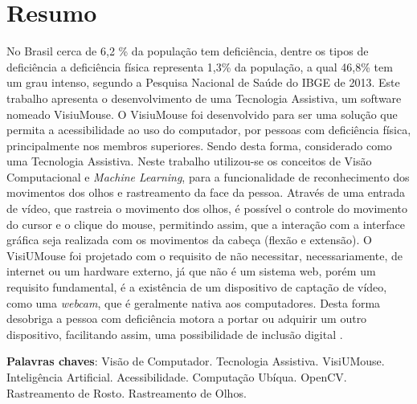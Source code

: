 \chapter*{Resumo}

\begin{singlespace}
{\fontsize{12pt}{\baselineskip} \selectfont \noindent
No Brasil cerca de 6,2 \% da população tem deficiência, dentre os tipos de deficiência a deficiência física representa 1,3\% da população, a qual 46,8\% tem um grau intenso, segundo a Pesquisa  Nacional de Saúde do IBGE de 2013. Este trabalho apresenta o desenvolvimento de uma Tecnologia Assistiva, um software nomeado VisiuMouse. O VisiuMouse foi desenvolvido para ser uma solução que permita a acessibilidade ao uso do computador, por pessoas com deficiência física, principalmente nos membros superiores. Sendo desta forma, considerado como uma Tecnologia Assistiva. Neste trabalho utilizou-se os conceitos de Visão Computacional e \textit{Machine Learning}, para a funcionalidade de reconhecimento dos movimentos dos olhos e rastreamento da face da pessoa. Através de uma entrada de vídeo, que rastreia o movimento dos olhos, é possível o controle do movimento do cursor e o clique do mouse, permitindo assim, que a interação com a interface gráfica seja realizada com os movimentos da cabeça (flexão e extensão). O VisiUMouse foi projetado com o requisito de não necessitar, necessariamente, de internet ou um hardware externo, já que não é um sistema web, porém um requisito fundamental, é a existência de um dispositivo de captação de vídeo, como uma \textit{webcam}, que é geralmente nativa aos computadores. Desta forma desobriga a pessoa com deficiência motora a portar ou adquirir um outro dispositivo, facilitando assim, uma possibilidade de inclusão digital .
}
\end{singlespace}

\begin{singlespace}
\noindent \onehalfspacing
\textbf{Palavras chaves}: Visão de Computador. Tecnologia Assistiva. VisiUMouse. Inteligência Artificial. Acessibilidade. Computação Ubíqua. OpenCV. Rastreamento de Rosto. Rastreamento de Olhos.
\end{singlespace}


